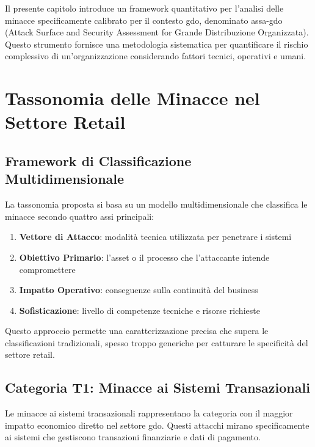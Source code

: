 Il presente capitolo introduce un framework quantitativo per l'analisi delle minacce specificamente calibrato per il contesto \gls{gdo}, denominato \gls{assa-gdo} (Attack Surface and Security Assessment for Grande Distribuzione Organizzata). Questo strumento fornisce una metodologia sistematica per quantificare il rischio complessivo di un'organizzazione considerando fattori tecnici, operativi e umani.

\section{\texorpdfstring{Tassonomia delle Minacce nel Settore Retail}{2.2 - Tassonomia delle Minacce nel Settore Retail}}
\label{sec:2.2_tassonomia}

\subsection{\texorpdfstring{Framework di Classificazione Multidimensionale}{2.2.1 - Framework di Classificazione Multidimensionale}}
\label{subsec:2.2.1_framework}

La tassonomia proposta si basa su un modello multidimensionale che classifica le minacce secondo quattro assi principali:

\begin{enumerate}
\item \textbf{Vettore di Attacco}: modalità tecnica utilizzata per penetrare i sistemi
\item \textbf{Obiettivo Primario}: l'asset o il processo che l'attaccante intende compromettere
\item \textbf{Impatto Operativo}: conseguenze sulla continuità del business
\item \textbf{Sofisticazione}: livello di competenze tecniche e risorse richieste
\end{enumerate}

Questo approccio permette una caratterizzazione precisa che supera le classificazioni tradizionali, spesso troppo generiche per catturare le specificità del settore retail.

\subsection{\texorpdfstring{Categoria T1: Minacce ai Sistemi Transazionali}{2.2.2 - Categoria T1: Minacce ai Sistemi Transazionali}}
\label{subsec:2.2.2_t1}

Le minacce ai sistemi transazionali rappresentano la categoria con il maggior impatto economico diretto nel settore \gls{gdo}. Questi attacchi mirano specificamente ai sistemi che gestiscono transazioni finanziarie e dati di pagamento.

